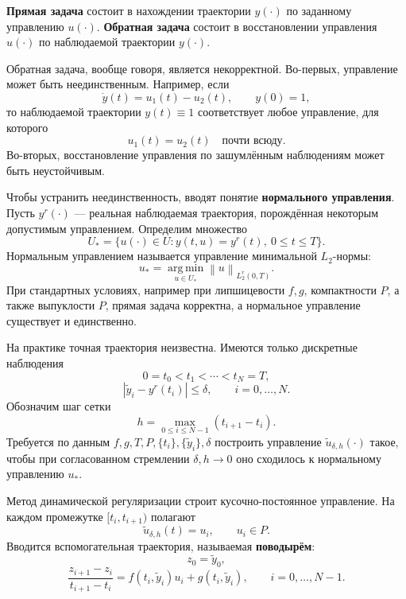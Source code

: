 \documentclass[12pt,a4paper]{article}
\newcommand{\norm}[1]{\left\lVert #1\right\rVert}
\begin{document}
\textbf{Прямая задача} состоит в нахождении траектории $y(\cdot)$ по заданному управлению $u(\cdot)$. \textbf{Обратная задача} состоит в восстановлении управления $u(\cdot)$ по наблюдаемой траектории $y(\cdot)$.

Обратная задача, вообще говоря, является некорректной. Во-первых, управление может быть неединственным. Например, если
\[
    \dot y(t)=u_1(t)-u_2(t),\qquad y(0)=1,
\]
то наблюдаемой траектории $y(t)\equiv 1$ соответствует любое управление, для которого
\[
    u_1(t)=u_2(t)\quad \text{почти всюду}.
\]
Во-вторых, восстановление управления по зашумлённым наблюдениям может быть неустойчивым.

Чтобы устранить неединственность, вводят понятие \textbf{нормального управления}. Пусть $y^r(\cdot)$ --- реальная наблюдаемая траектория, порождённая некоторым допустимым управлением. Определим множество
\begin{equation}
    U_* = \{u(\cdot)\in U: y(t,u)=y^r(t),\ 0\le t\le T\}.
\end{equation}
Нормальным управлением называется управление минимальной $L_2$-нормы:
\begin{equation}
    u_* = \operatorname*{arg\,min}_{u\in U_*}\norm{u}_{L_2^r(0,T)}.
\end{equation}
При стандартных условиях, например при липшицевости $f,g$, компактности $P$, а также выпуклости $P$, прямая задача корректна, а нормальное управление существует и единственно.

На практике точная траектория неизвестна. Имеются только дискретные наблюдения
\[
    0=t_0<t_1<\cdots<t_N=T,
\]
\begin{equation}
    |\tilde y_i-y^r(t_i)|\le \delta,
    \qquad i=0,\ldots,N.
\end{equation}
Обозначим шаг сетки
\begin{equation}
    h=\max_{0\le i\le N-1}(t_{i+1}-t_i).
\end{equation}
Требуется по данным $f,g,T,P,\{t_i\},\{\tilde y_i\},\delta$ построить управление $\tilde u_{\delta,h}(\cdot)$ такое, чтобы при согласованном стремлении $\delta,h\to0$ оно сходилось к нормальному управлению $u_*$.

Метод динамической регуляризации строит кусочно-постоянное управление. На каждом промежутке $[t_i,t_{i+1})$ полагают
\begin{equation}
    \tilde u_{\delta,h}(t)=u_i,
    \qquad u_i\in P.
\end{equation}
Вводится вспомогательная траектория, называемая \textbf{поводырём}:
\begin{equation}
    z_0=\tilde y_0,
\end{equation}
\begin{equation}
    \frac{z_{i+1}-z_i}{t_{i+1}-t_i}
    =f(t_i,\tilde y_i)u_i+g(t_i,\tilde y_i),
    \qquad i=0,\ldots,N-1.
\end{equation}
\end{document}
